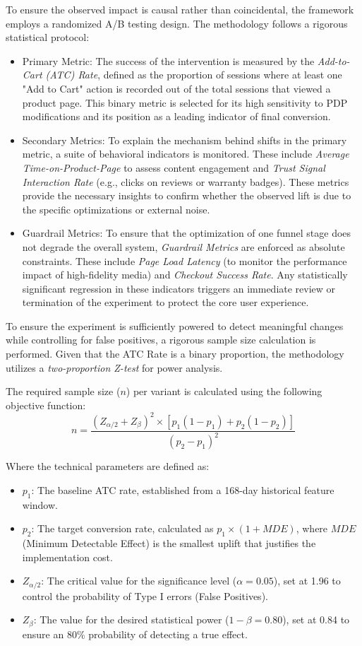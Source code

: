 \documentclass[conference]{IEEEtran}
\begin{document}
To ensure the observed impact is causal rather than coincidental, the framework employs a randomized A/B testing design. The methodology follows a rigorous statistical protocol:
\begin{itemize}
    \item Primary Metric: The success of the intervention is measured by the \textit{Add-to-Cart (ATC) Rate}, defined as the proportion of sessions where at least one "Add to Cart" action is recorded out of the total sessions that viewed a product page. This binary metric is selected for its high sensitivity to PDP modifications and its position as a leading indicator of final conversion.
    \item Secondary Metrics: To explain the mechanism behind shifts in the primary metric, a suite of behavioral indicators is monitored. These include \textit{Average Time-on-Product-Page} to assess content engagement and \textit{Trust Signal Interaction Rate} (e.g., clicks on reviews or warranty badges). These metrics provide the necessary insights to confirm whether the observed lift is due to the specific optimizations or external noise.
    \item Guardrail Metrics: To ensure that the optimization of one funnel stage does not degrade the overall system, \textit{Guardrail Metrics} are enforced as absolute constraints. These include \textit{Page Load Latency} (to monitor the performance impact of high-fidelity media) and \textit{Checkout Success Rate}. Any statistically significant regression in these indicators triggers an immediate review or termination of the experiment to protect the core user experience.
\end{itemize}

To ensure the experiment is sufficiently powered to detect meaningful changes while controlling for false positives, a rigorous sample size calculation is performed. Given that the ATC Rate is a binary proportion, the methodology utilizes a \textit{two-proportion Z-test} for power analysis.

The required sample size ($n$) per variant is calculated using the following objective function:
\begin{equation}
n = \frac{(Z_{\alpha/2} + Z_{\beta})^2 \times [p_1(1-p_1) + p_2(1-p_2)]}{(p_2 - p_1)^2}
\end{equation}

Where the technical parameters are defined as:
\begin{itemize}
    \item $p_1$: The baseline ATC rate, established from a 168-day historical feature window.
    \item $p_2$: The target conversion rate, calculated as $p_1 \times (1 + MDE)$, where $MDE$ (Minimum Detectable Effect) is the smallest uplift that justifies the implementation cost.
    \item $Z_{\alpha/2}$: The critical value for the significance level ($\alpha = 0.05$), set at 1.96 to control the probability of Type I errors (False Positives).
    \item $Z_{\beta}$: The value for the desired statistical power ($1-\beta = 0.80$), set at 0.84 to ensure an 80\% probability of detecting a true effect.
\end{itemize}
\end{document}
